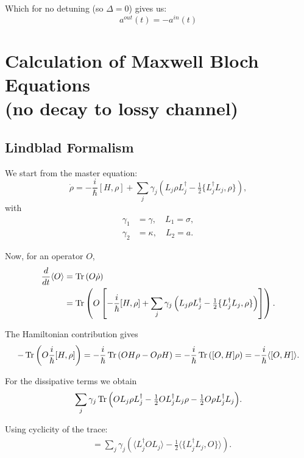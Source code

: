 \documentclass[a4paper]{article}
\begin{document}
Which for no detuning (so $\Delta=0$) gives us:
\begin{equation}
    a^{out}(t) =-a^{in}(t)
\end{equation}

\section{Calculation of Maxwell Bloch Equations \\(no decay to lossy channel)}

\subsection{Lindblad Formalism}

We start from the master equation:
\begin{equation}
\dot{\rho} = -\frac{i}{\hbar}[H,\rho] + \sum_j \gamma_j \left( L_j \rho L_j^\dagger - \tfrac{1}{2}\{ L_j^\dagger L_j, \rho \} \right),
\end{equation}
with
\begin{align}
\gamma_1 &= \gamma, \quad L_1 = \sigma, \\
\gamma_2 &= \kappa, \quad L_2 = a.
\end{align}

Now, for an operator \(O\),
\begin{align}
\frac{d}{dt} \langle O \rangle &= \Tr \left( O \dot{\rho} \right) \\
&= \Tr \left( O \left[ -\frac{i}{\hbar}[H,\rho] + \sum_j \gamma_j \left( L_j \rho L_j^\dagger - \tfrac{1}{2}\{ L_j^\dagger L_j, \rho \} \right) \right] \right).
\end{align}

The Hamiltonian contribution gives
\begin{equation}
- \Tr \left( O \frac{i}{\hbar}[H,\rho] \right)
= -\frac{i}{\hbar}\Tr \left( O H \rho - O \rho H \right)
= -\frac{i}{\hbar}\Tr \left( [O,H]\rho \right)
= -\frac{i}{\hbar} \langle [O,H] \rangle.
\end{equation}

For the dissipative terms we obtain
\begin{align}
\sum_j \gamma_j \Tr\Big( O L_j \rho L_j^\dagger 
- \tfrac{1}{2} O L_j^\dagger L_j \rho 
- \tfrac{1}{2} O \rho L_j^\dagger L_j \Big).
\end{align}

Using cyclicity of the trace:
\begin{align}
&= \sum_j \gamma_j \left( \langle L_j^\dagger O L_j \rangle 
- \tfrac{1}{2} \langle \{ L_j^\dagger L_j, O \} \rangle \right).
\end{align}
\end{document}
